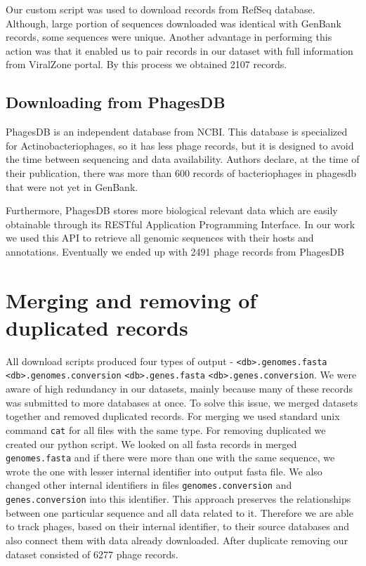 Our custom script was used to download records from RefSeq database.
Although, large portion of sequences downloaded was identical with GenBank records, some sequences were unique.
Another advantage in performing this action was that it enabled us to pair records in our dataset with full information from ViralZone portal.
By this process we obtained 2107 records. 


\subsection{Downloading from PhagesDB}
PhagesDB is an independent database from NCBI. 
This database is specialized for Actinobacteriophages, so it has less phage records, but it is designed to avoid the time between sequencing and data availability.
Authors declare, at the time of their publication, there was more than 600 records of bacteriophages in phagesdb that were not yet in GenBank.

Furthermore, PhagesDB stores more biological relevant data which are easily obtainable through its RESTful Application Programming Interface.
In our work we used this API to retrieve all genomic sequences with their hosts and annotations.
Eventually we ended up with 2491 phage records from PhagesDB 

\section{Merging and removing of duplicated records}
All download scripts produced four types of output - \verb|<db>.genomes.fasta| \verb|<db>.genomes.conversion| \verb|<db>.genes.fasta| \verb|<db>.genes.conversion|. 
We were aware of high redundancy in our datasets, mainly because many of these records was submitted to more databases at once.
To solve this issue, we merged datasets together and removed duplicated records.
For merging we used standard unix command \verb|cat| for all files with the same type.
For removing duplicated we created our python script.
We looked on all fasta records in merged \verb|genomes.fasta| and if there were more than one with the same sequence, we wrote the one with lesser internal identifier into output fasta file.
We also changed other internal identifiers in files \verb|genomes.conversion| and \verb|genes.conversion| into this identifier.
This approach preserves the relationships between one particular sequence and all data related to it.
Therefore we are able to track phages, based on their internal identifier, to their source databases and also connect them with data already downloaded.
After duplicate removing our dataset consisted of 6277 phage records.

